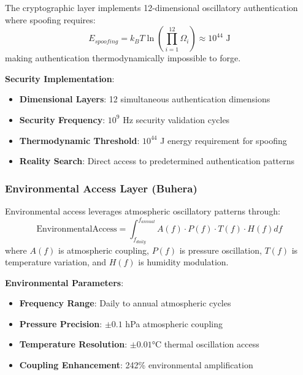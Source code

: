 \documentclass[11pt,a4paper]{article}
\begin{document}
\begin{itemize}
\begin{itemize}
\begin{definition}
The cryptographic layer implements 12-dimensional oscillatory authentication where spoofing requires:
\begin{equation}
E_{spoofing} = k_B T \ln\left(\prod_{i=1}^{12} \Omega_i\right) \approx 10^{44} \text{ J}
\end{equation}
making authentication thermodynamically impossible to forge.
\end{definition}

\textbf{Security Implementation}:
\begin{itemize}
\item \textbf{Dimensional Layers}: 12 simultaneous authentication dimensions
\item \textbf{Security Frequency}: $10^9$ Hz security validation cycles
\item \textbf{Thermodynamic Threshold}: $10^{44}$ J energy requirement for spoofing
\item \textbf{Reality Search}: Direct access to predetermined authentication patterns
\end{itemize}

\subsubsection{Environmental Access Layer (Buhera)}

\begin{definition}
Environmental access leverages atmospheric oscillatory patterns through:
\begin{equation}
\text{EnvironmentalAccess} = \int_{f_{daily}}^{f_{annual}} A(f) \cdot P(f) \cdot T(f) \cdot H(f) df
\end{equation}
where $A(f)$ is atmospheric coupling, $P(f)$ is pressure oscillation, $T(f)$ is temperature variation, and $H(f)$ is humidity modulation.
\end{definition}

\textbf{Environmental Parameters}:
\begin{itemize}
\item \textbf{Frequency Range}: Daily to annual atmospheric cycles
\item \textbf{Pressure Precision}: $\pm 0.1$ hPa atmospheric coupling
\item \textbf{Temperature Resolution}: $\pm 0.01$°C thermal oscillation access
\item \textbf{Coupling Enhancement}: 242\% environmental amplification
\end{itemize}


\end{itemize}
\end{itemize}
\end{document}
